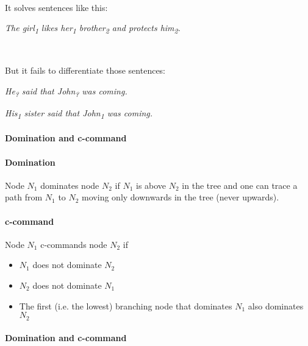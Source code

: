 \documentclass[a4paper]{article}
\begin{document}
~\par

It solves sentences like this:

{\em \hspace{\parindent} The girl\textsubscript{1} likes her\textsubscript{1} brother\textsubscript{2} and protects him\textsubscript{2}.}

~\par

But it fails to differentiate those sentences:

{\em \hspace{\parindent} He\textsubscript{?} said that John\textsubscript{?} was coming.}

{\em \hspace{\parindent} His\textsubscript{1} sister said that John\textsubscript{1} was coming.}

\paragraph{Domination and c-command}

\paragraph{Domination}
Node $N_1$ dominates node $N_2$ if $N_1$ is above $N_2$ in the tree and one can trace a path from $N_1$ to $N_2$ moving only downwards in the tree (never upwards).

\paragraph{c-command}
Node $N_1$ c-commands node $N_2$ if
\begin{itemize}
\item $N_1$ does not dominate $N_2$
\item $N_2$ does not dominate $N_1$
\item The first (i.e. the lowest) branching node that dominates $N_1$ also dominates $N_2$
\end{itemize}

\paragraph{Domination and c-command}

\begin{center}
\end{center}
\end{document}

